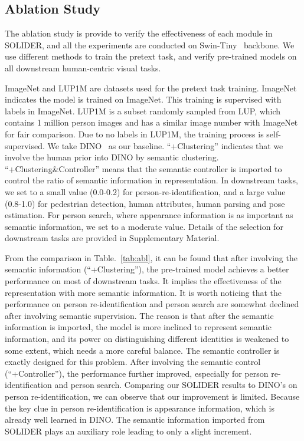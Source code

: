 \documentclass[10pt,twocolumn,letterpaper]{article}
\begin{document}
\subsection{Ablation Study}
\label{ssec:ablation}

The ablation study is provide to verify the effectiveness of each module in SOLIDER, and all the experiments are conducted on Swin-Tiny~\cite{swin} backbone. We use different methods to train the pretext task, and verify pre-trained models on all downstream human-centric visual tasks.

ImageNet and LUP1M are datasets used for the pretext task training. 
ImageNet indicates the model is trained on ImageNet. This training is supervised with labels in ImageNet. LUP1M is a subset randomly sampled from LUP, which contains 1 million person images and has a similar image number with ImageNet for fair comparison. Due to no labels in LUP1M, the training process is self-supervised. We take DINO~\cite{dino} as our baseline. ``+Clustering'' indicates that we involve the human prior into DINO by semantic clustering. ``+Clustering\&Controller'' means that the semantic controller is imported to control the ratio of semantic information in representation. In downstream tasks, we set  to a small value (0.0-0.2) for person-re-identification, and a large value (0.8-1.0) for pedestrian detection, human attributes, human parsing and pose estimation. For person search, where appearance information is as important as semantic information, we set   to a moderate value. Details of the  selection for downstream tasks are provided in Supplementary Material.

From the comparison in Table.~\ref{tab:abl}, 
it can be found that after involving the semantic information (``+Clustering''), the pre-trained model achieves a better performance on most of downstream tasks. It implies the effectiveness of the representation with more semantic information. It is worth noticing that the performance on person re-identification and person search are somewhat declined after involving semantic supervision. The reason is that after the semantic information is imported, the model is more inclined to represent semantic information, and its power on distinguishing different identities is weakened to some extent, which needs a more careful balance. The semantic controller is exactly designed for this problem. After involving the semantic control (``+Controller''), the performance further improved, especially for person re-identification and person search. 
Comparing our SOLIDER results to DINO's on person re-identification, we can observe that our improvement is limited. Because the key clue in person re-identification is appearance information, which is already well learned in DINO. The semantic information imported from SOLIDER plays an auxiliary role leading to only a slight increment.
\end{document}
